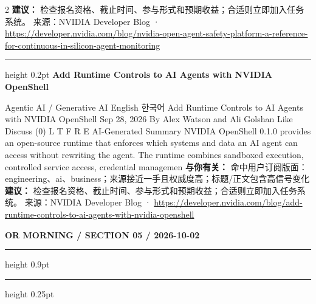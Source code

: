 \documentclass[10.5pt]{ctexart}
\begin{document}
\begin{multicols}{2}
\textbf{建议：} 检查报名资格、截止时间、参与形式和预期收益；合适则立即加入任务系统。
{\footnotesize\color{ormuted} 来源：NVIDIA Developer Blog · \url{https://developer.nvidia.com/blog/nvidia-open-agent-safety-platform-a-reference-for-continuous-in-silicon-agent-monitoring}}
\vspace{2mm}
\hrule height 0.2pt
\vspace{2mm}
{\large\bfseries Add Runtime Controls to AI Agents with NVIDIA OpenShell}\par
Agentic AI / Generative AI English 한국어 Add Runtime Controls to AI Agents with NVIDIA OpenShell Sep 28, 2026 By Alex Watson and Ali Golshan Like Discuss (0) L T F R E AI-Generated Summary NVIDIA OpenShell 0.1.0 provides an open-source runtime that enforces which systems and data an AI agent can access without rewriting the agent. The runtime combines sandboxed execution, controlled service access, credential managemen
\textbf{与你有关：} 命中用户订阅版面：engineering、ai、business；来源接近一手且权威度高；标题/正文包含高信号变化
\textbf{建议：} 检查报名资格、截止时间、参与形式和预期收益；合适则立即加入任务系统。
{\footnotesize\color{ormuted} 来源：NVIDIA Developer Blog · \url{https://developer.nvidia.com/blog/add-runtime-controls-to-ai-agents-with-nvidia-openshell}}
\end{multicols}
\newpage
{\small\bfseries OR MORNING / SECTION 05 / 2026-10-02}
\vspace{2mm}
\hrule height 0.9pt
\vspace{1.5mm}
\hrule height 0.25pt
\vspace{4mm}
\end{document}
